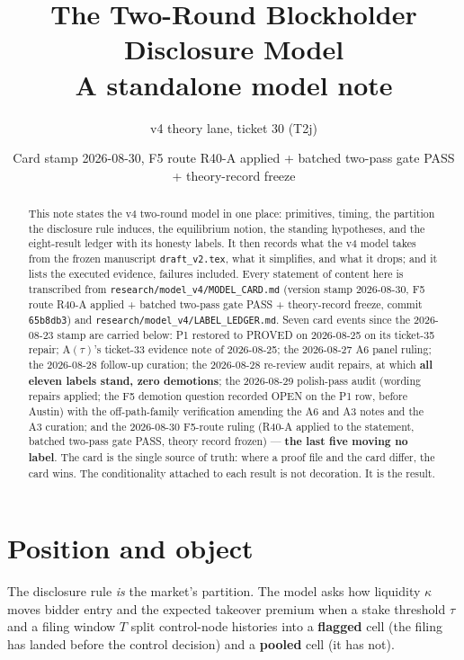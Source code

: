 \documentclass[11pt,a4paper]{article}
\title{The Two-Round Blockholder Disclosure Model\\[2pt]
\large A standalone model note}
\author{v4 theory lane, ticket 30 (T2j)}
\date{Card stamp 2026-08-30, F5 route R40-A applied + batched two-pass gate PASS + theory-record freeze}
\newcommand{\Atau}{\mathrm{A}(\tau)}
\begin{document}
\maketitle

\begin{abstract}
\noindent This note states the v4 two-round model in one place: primitives, timing,
the partition the disclosure rule induces, the equilibrium notion, the standing
hypotheses, and the eight-result ledger with its honesty labels. It then records
what the v4 model takes from the frozen manuscript \texttt{draft\_v2.tex}, what it
simplifies, and what it drops; and it lists the executed evidence, failures
included. Every statement of content here is transcribed from
\texttt{research/model\_v4/MODEL\_CARD.md} (version stamp 2026-08-30, F5 route R40-A applied +
batched two-pass gate PASS + theory-record freeze, commit
\texttt{65b8db3}) and \texttt{research/model\_v4/LABEL\_LEDGER.md}. Seven
card events since the 2026-08-23 stamp are carried below: P1 restored to PROVED on
2026-08-25 on its ticket-35 repair; $\Atau$'s ticket-33 evidence note of
2026-08-25; the 2026-08-27 A6 panel ruling; the 2026-08-28 follow-up curation;
the 2026-08-28 re-review audit repairs, at which \textbf{all eleven labels
stand, zero demotions}; the 2026-08-29 polish-pass audit (wording repairs
applied; the F5 demotion question recorded OPEN on the P1 row, before Austin)
with the off-path-family verification amending the A6 and A3 notes and the A3
curation; and the 2026-08-30 F5-route ruling (R40-A applied to the statement,
batched two-pass gate PASS, theory record frozen)
--- \textbf{the last five moving no label}. The card is the single
source of truth: where a proof file and the card differ, the card wins. The
conditionality attached to each result is not decoration. It is the result.
\end{abstract}

\section{Position and object}

The disclosure rule \emph{is} the market's partition. The model asks how liquidity
$\kappa$ moves bidder entry and the expected takeover premium when a stake threshold
$\tau$ and a filing window $T$ split control-node histories into a \textbf{flagged}
cell (the filing has landed before the control decision) and a \textbf{pooled} cell
(it has not).
\end{document}
